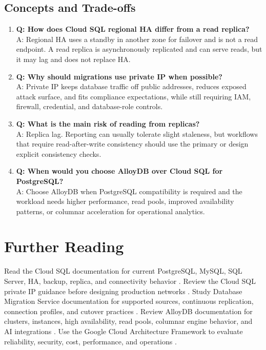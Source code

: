 \subsection{Concepts and Trade-offs}
\begin{enumerate}
    \item \textbf{Q: How does Cloud SQL regional HA differ from a read replica?}\\
    A: Regional HA uses a standby in another zone for failover and is not a read endpoint. A read replica is asynchronously replicated and can serve reads, but it may lag and does not replace HA.

    \item \textbf{Q: Why should migrations use private IP when possible?}\\
    A: Private IP keeps database traffic off public addresses, reduces exposed attack surface, and fits compliance expectations, while still requiring IAM, firewall, credential, and database-role controls.

    \item \textbf{Q: What is the main risk of reading from replicas?}\\
    A: Replica lag. Reporting can usually tolerate slight staleness, but workflows that require read-after-write consistency should use the primary or design explicit consistency checks.

    \item \textbf{Q: When would you choose AlloyDB over Cloud SQL for PostgreSQL?}\\
    A: Choose AlloyDB when PostgreSQL compatibility is required and the workload needs higher performance, read pools, improved availability patterns, or columnar acceleration for operational analytics.
\end{enumerate}

\section{Further Reading}
Read the Cloud SQL documentation for current PostgreSQL, MySQL, SQL Server, HA, backup, replica, and connectivity behavior \cite{googlecloudsqldocs}. Review the Cloud SQL private IP guidance before designing production networks \cite{googlecloudsqlprivateip}. Study Database Migration Service documentation for supported sources, continuous replication, connection profiles, and cutover practices \cite{googleclouddmsdocs}. Review AlloyDB documentation for clusters, instances, high availability, read pools, columnar engine behavior, and AI integrations \cite{googlecloudalloydbdocs,googlecloudalloydbcolumnar,googlecloudalloydbai}. Use the Google Cloud Architecture Framework to evaluate reliability, security, cost, performance, and operations \cite{googlecloudarchitectureframework}.

